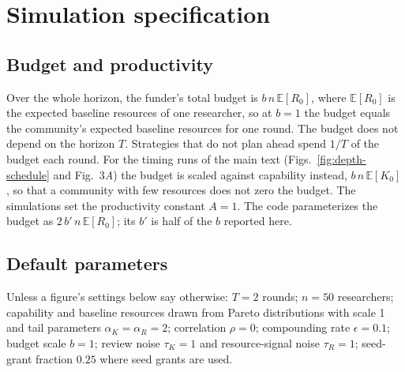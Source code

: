 \section{Simulation specification}\label{app:simulation}

\subsection*{Budget and productivity}
Over the whole horizon, the funder's total budget is $b\,n\,\mathbb{E}[R_{0}]$, where $\mathbb{E}[R_0]$ is the expected baseline resources of one researcher, so at $b = 1$ the budget equals the community's expected baseline resources for one round. The budget does not depend on the horizon $T$. Strategies that do not plan ahead spend $1/T$ of the budget each round. For the timing runs of the main text (Figs.~\ref{fig:depth-schedule} and Fig.~3\textit{A}) the budget is scaled against capability instead, $b\,n\,\mathbb{E}[K_0]$, so that a community with few resources does not zero the budget. The simulations set the productivity constant $A = 1$. The code parameterizes the budget as $2\,b'\,n\,\mathbb{E}[R_0]$; its $b'$ is half of the $b$ reported here.

\subsection*{Default parameters}
Unless a figure's settings below say otherwise: $T = 2$ rounds; $n = 50$ researchers; capability and baseline resources drawn from Pareto distributions with scale 1 and tail parameters $\alpha_K = \alpha_R = 2$; correlation $\rho = 0$; compounding rate $\epsilon = 0.1$; budget scale $b = 1$; review noise $\tau_K = 1$ and resource-signal noise $\tau_R = 1$; seed-grant fraction $0.25$ where seed grants are used.

